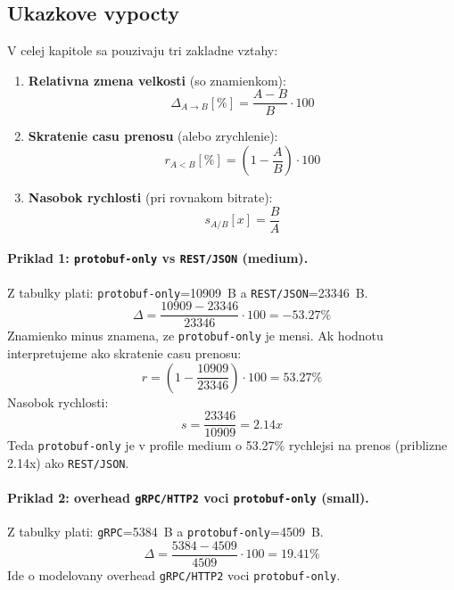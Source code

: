 \documentclass[12pt,a4paper]{report}
\begin{document}
\subsection{Ukazkove vypocty}

V celej kapitole sa pouzivaju tri zakladne vztahy:
\begin{enumerate}
  \item \textbf{Relativna zmena velkosti} (so znamienkom):
  \begin{equation}
  \Delta_{A \rightarrow B} [\%] = \frac{A - B}{B} \cdot 100
  \end{equation}
  \item \textbf{Skratenie casu prenosu} (alebo zrychlenie):
  \begin{equation}
  r_{A<B} [\%] = \left(1 - \frac{A}{B}\right) \cdot 100
  \end{equation}
  \item \textbf{Nasobok rychlosti} (pri rovnakom bitrate):
  \begin{equation}
  s_{A/B} [x] = \frac{B}{A}
  \end{equation}
\end{enumerate}

\paragraph{Priklad 1: \texttt{protobuf-only} vs \texttt{REST/JSON} (medium).}
Z tabulky plati:
\texttt{protobuf-only}=10909~B a \texttt{REST/JSON}=23346~B.
\begin{equation}
\Delta = \frac{10909 - 23346}{23346} \cdot 100 = -53.27\%
\end{equation}
Znamienko minus znamena, ze \texttt{protobuf-only} je mensi.
Ak hodnotu interpretujeme ako skratenie casu prenosu:
\begin{equation}
r = \left(1-\frac{10909}{23346}\right)\cdot100 = 53.27\%
\end{equation}
Nasobok rychlosti:
\begin{equation}
s = \frac{23346}{10909} = 2.14x
\end{equation}
Teda \texttt{protobuf-only} je v profile medium o 53.27\% rychlejsi
na prenos (priblizne 2.14x) ako \texttt{REST/JSON}.

\paragraph{Priklad 2: overhead \texttt{gRPC/HTTP2} voci \texttt{protobuf-only} (small).}
Z tabulky plati:
\texttt{gRPC}=5384~B a \texttt{protobuf-only}=4509~B.
\begin{equation}
\Delta = \frac{5384 - 4509}{4509}\cdot100 = 19.41\%
\end{equation}
Ide o modelovany overhead \texttt{gRPC/HTTP2} voci \texttt{protobuf-only}.
\end{document}
